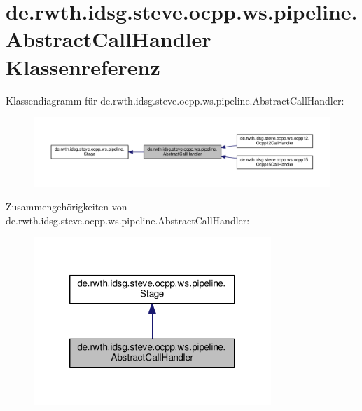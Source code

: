 \hypertarget{classde_1_1rwth_1_1idsg_1_1steve_1_1ocpp_1_1ws_1_1pipeline_1_1_abstract_call_handler}{\section{de.\-rwth.\-idsg.\-steve.\-ocpp.\-ws.\-pipeline.\-Abstract\-Call\-Handler Klassenreferenz}
\label{classde_1_1rwth_1_1idsg_1_1steve_1_1ocpp_1_1ws_1_1pipeline_1_1_abstract_call_handler}
}


Klassendiagramm für de.\-rwth.\-idsg.\-steve.\-ocpp.\-ws.\-pipeline.\-Abstract\-Call\-Handler\-:
\nopagebreak
\begin{figure}[H]
\begin{center}
\leavevmode
\includegraphics[width=350pt]{classde_1_1rwth_1_1idsg_1_1steve_1_1ocpp_1_1ws_1_1pipeline_1_1_abstract_call_handler__inherit__graph}
\end{center}
\end{figure}


Zusammengehörigkeiten von de.\-rwth.\-idsg.\-steve.\-ocpp.\-ws.\-pipeline.\-Abstract\-Call\-Handler\-:
\nopagebreak
\begin{figure}[H]
\begin{center}
\leavevmode
\includegraphics[width=254pt]{classde_1_1rwth_1_1idsg_1_1steve_1_1ocpp_1_1ws_1_1pipeline_1_1_abstract_call_handler__coll__graph}
\end{center}
\end{figure}
